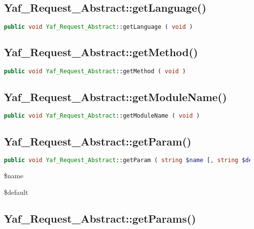 \subsection{Yaf\_Request\_Abstract::getLanguage()}




\begin{lstlisting}[language=PHP]
public void Yaf_Request_Abstract::getLanguage ( void )
\end{lstlisting}


\subsection{Yaf\_Request\_Abstract::getMethod()}





\begin{lstlisting}[language=PHP]
public void Yaf_Request_Abstract::getMethod ( void )
\end{lstlisting}



\subsection{Yaf\_Request\_Abstract::getModuleName()}




\begin{lstlisting}[language=PHP]
public void Yaf_Request_Abstract::getModuleName ( void )
\end{lstlisting}




\subsection{Yaf\_Request\_Abstract::getParam()}



\begin{lstlisting}[language=PHP]
public void Yaf_Request_Abstract::getParam ( string $name [, string $default ] )
\end{lstlisting}

\begin{compactitem}
\item \$name
\item \$default
\end{compactitem}



\subsection{Yaf\_Request\_Abstract::getParams()}




